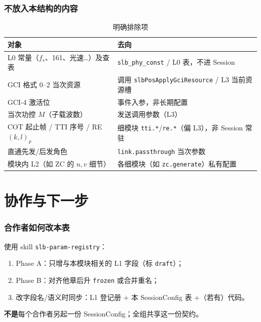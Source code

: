\documentclass[11pt,a4paper]{ctexart}
\begin{document}
\section{不放入本结构的内容}

\begin{longtable}{L{4.5cm}L{10.2cm}}
\caption{明确排除项\label{tab:excl}} \\
\toprule
\textbf{对象} & \textbf{去向} \\
\midrule
L0 常量（$f_s$、161、光速…）及查表 & \texttt{slb\_phy\_const} / L0 表，不进 Session \\
GCI 格式 0--2 当次资源 & 调用 \texttt{slbPosApplyGciResource} / L3 当前资源槽 \\
GCI-4 激活位 & 事件入参，非长期配置 \\
当次功控 $M$（子载波数） & 发送调用参数（L3） \\
COT 起止帧 / TTI 序号 / RE $(k,l)_p$ & 细模块 \texttt{tti.*}/\texttt{re.*}（偏 L3），非 Session 常驻 \\
直通先发/后发角色 & \texttt{link.passthrough} 当次参数 \\
模块内 L2（如 ZC 的 $u,v$ 细节） & 各细模块（如 \texttt{zc.generate}）私有配置 \\
\bottomrule
\end{longtable}

\newpage
\part{协作与下一步}

\section{合作者如何改本表}

使用 skill \texttt{slb-param-registry}：
\begin{enumerate}[nosep]
  \item Phase A：只增与本模块相关的 L1 字段（标 \texttt{draft}）；
  \item Phase B：对齐他章后升 \texttt{frozen} 或合并重名；
  \item 改字段名/语义时同步：L1 登记册 + 本 SessionConfig 表 +（若有）代码。
\end{enumerate}

\textbf{不是}每个合作者另起一份 SessionConfig；全组共享这一份契约。
\end{document}
